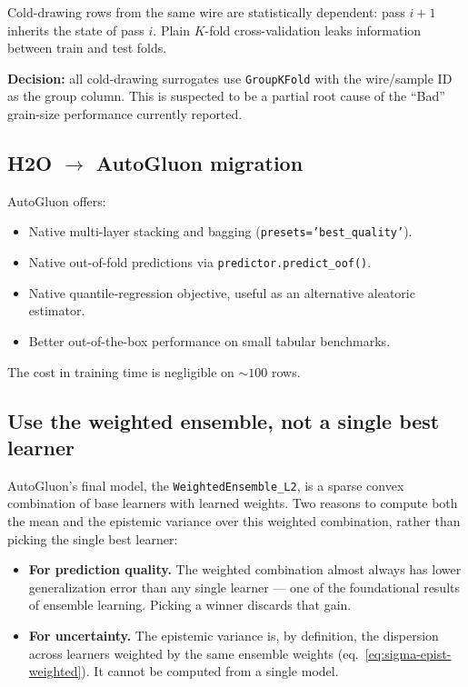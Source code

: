 \documentclass[11pt,a4paper]{article}
\begin{document}
\begin{cautionbox}
Cold-drawing rows from the same wire are statistically dependent: pass $i+1$ inherits the state of pass $i$. Plain $K$-fold cross-validation leaks information between train and test folds.

\textbf{Decision:} all cold-drawing surrogates use \texttt{GroupKFold} with the wire/sample ID as the group column. This is suspected to be a partial root cause of the ``Bad'' grain-size performance currently reported.
\end{cautionbox}

\subsection{H2O $\rightarrow$ AutoGluon migration}

\begin{decisionbox}
AutoGluon offers:
\begin{itemize}
    \item Native multi-layer stacking and bagging (\texttt{presets='best\_quality'}).
    \item Native out-of-fold predictions via \texttt{predictor.predict\_oof()}.
    \item Native quantile-regression objective, useful as an alternative aleatoric estimator.
    \item Better out-of-the-box performance on small tabular benchmarks.
\end{itemize}
The cost in training time is negligible on $\sim 100$ rows.
\end{decisionbox}

\subsection{Use the weighted ensemble, not a single best learner}

AutoGluon's final model, the \texttt{WeightedEnsemble\_L2}, is a sparse convex combination of base learners with learned weights. Two reasons to compute both the mean and the epistemic variance over this weighted combination, rather than picking the single best learner:

\begin{itemize}
    \item \textbf{For prediction quality.} The weighted combination almost always has lower generalization error than any single learner --- one of the foundational results of ensemble learning. Picking a winner discards that gain.
    \item \textbf{For uncertainty.} The epistemic variance is, by definition, the dispersion across learners weighted by the same ensemble weights (eq.~\eqref{eq:sigma-epist-weighted}). It cannot be computed from a single model.
\end{itemize}
\end{document}
